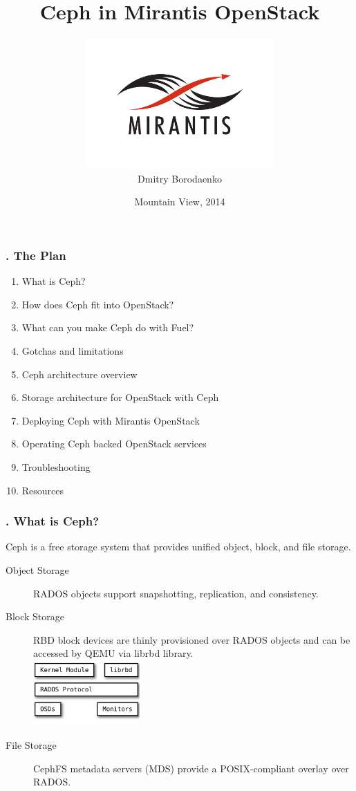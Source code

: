 \documentclass[hyperref=unicode,utf8,xcolor=pst]{beamer}
\title{Ceph in Mirantis OpenStack}
\author{\includegraphics[height=5cm]{Vector_RGB_MirantisLogo}\\Dmitry Borodaenko}
\date{Mountain View, 2014}
\begin{document}
\begin{frame}
	\titlepage
\end{frame}

\begin{frame}
	\setcounter{framenumber}{1}
	\frametitle{\insertframenumber{}. The Plan}
	\begin{enumerate}
		\item What is Ceph?
		\item How does Ceph fit into OpenStack?
		\item What can you make Ceph do with Fuel?
		\item Gotchas and limitations
		\item Ceph architecture overview
		\item Storage architecture for OpenStack with Ceph
		\item Deploying Ceph with Mirantis OpenStack
		\item Operating Ceph backed OpenStack services
		\item Troubleshooting
		\item Resources
	\end{enumerate}
\end{frame}

\begin{frame}
	\frametitle{\insertframenumber{}. What is Ceph?}
	Ceph is a free storage system that provides unified object,
	block, and file storage.

	\begin{description}
		\item[Object Storage] RADOS objects support
			snapshotting, replication, and consistency.
		\item[Block Storage] RBD block devices are thinly
			provisioned over RADOS objects and can be
			accessed by QEMU via librbd library.\\
			\includegraphics[height=2.5cm]{ceph-rbd}
		\item[File Storage] CephFS metadata servers (MDS)
			provide a POSIX-compliant overlay over RADOS.
	\end{description}
\end{frame}
\end{document}
